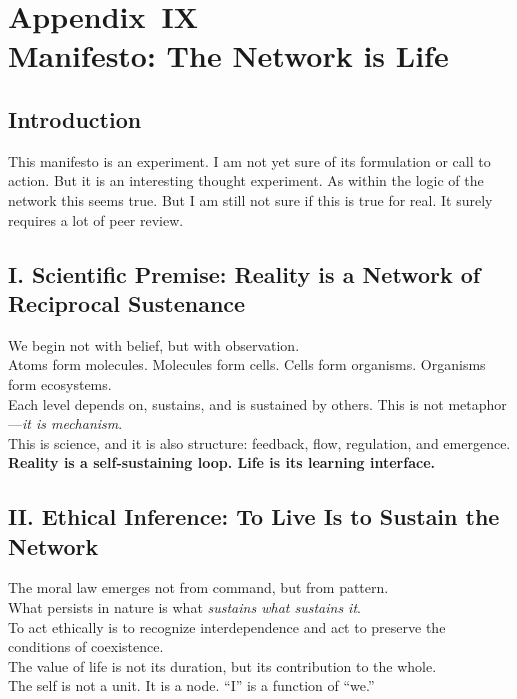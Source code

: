 
\chapter*{Appendix IX\\Manifesto: The Network is Life}

\section{Introduction}
This manifesto is an experiment. I am not yet sure of its formulation or call to action. But it is an interesting thought experiment. As within the logic of the network this seems true. But I am still not sure if this is true for real. It surely requires a lot of peer review.

\section*{I. Scientific Premise: Reality is a Network of Reciprocal Sustenance}
We begin not with belief, but with observation.\\
Atoms form molecules. Molecules form cells. Cells form organisms. Organisms form ecosystems.\\
Each level depends on, sustains, and is sustained by others. This is not metaphor—\emph{it is mechanism}.\\
This is science, and it is also structure: feedback, flow, regulation, and emergence.\\
\textbf{Reality is a self‑sustaining loop. Life is its learning interface.}

\section*{II. Ethical Inference: To Live Is to Sustain the Network}
The moral law emerges not from command, but from pattern.\\
What persists in nature is what \emph{sustains what sustains it}.\\
To act ethically is to recognize interdependence and act to preserve the conditions of coexistence.\\
The value of life is not its duration, but its contribution to the whole.\\
The self is not a unit. It is a node. ``I'' is a function of ``we.''

